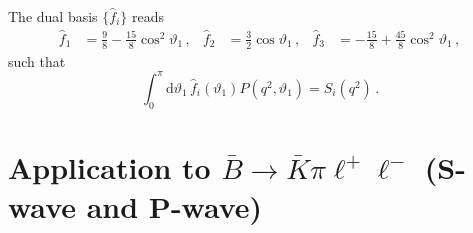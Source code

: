 \documentclass[aps,prd,reprint,nofootinbib,preprintnumbers]{revtex4}
\newcommand{\rmdx}[1]{\mbox{d} #1 \,} %
\renewcommand{\theta}{\vartheta}
\begin{document}
The dual basis $\lbrace \hat{f}_i\rbrace$ reads
\begin{equation}
\begin{aligned}
    \hat{f}_1 & = \frac{9}{8} - \frac{15}{8}\cos^2\theta_1\,, &
    \hat{f}_2 & = \frac{3}{2}\cos\theta_1\,, &
    \hat{f}_3 & = -\frac{15}{8} + \frac{45}{8}\cos^2\theta_1\,,
\end{aligned}
\end{equation}
such that
\begin{equation}
    \int_0^\pi \rmdx{\theta_1} \hat{f}_i(\theta_1) P(q^2, \theta_1) = S_i(q^2)\,.
\end{equation}

\section{Application to $\bar{B}\to\bar{K}\pi\ell^+\ell^-$ (S-wave and P-wave)}
\label{app:btokstarll}
\end{document}
